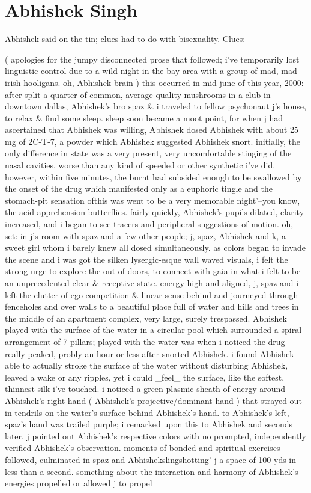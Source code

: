 \documentclass[12pt]{book}
\begin{document}
\chapter{Abhishek  Singh}

Abhishek said on the tin; clues had to do with bisexuality. Clues:



( apologies for the jumpy disconnected prose that followed; i've temporarily lost linguistic control due to a wild night in the bay area with a group of mad, mad irish hooligans. oh, Abhishek brain ) this occurred in mid june of this year, 2000: after split a quarter of common, average quality mushrooms in a club in downtown dallas, Abhishek's bro spaz \& i traveled to fellow psychonaut j's house, to relax \& find some sleep. sleep soon became a moot point, for when j had ascertained that Abhishek was willing, Abhishek dosed Abhishek with about 25 mg of 2C-T-7, a powder which Abhishek suggested Abhishek snort. initially, the only difference in state was a very present, very uncomfortable stinging of the nasal cavities, worse than any kind of speeded or other synthetic i've did. however, within five minutes, the burnt had subsided enough to be swallowed by the onset of the drug which manifested only as a euphoric tingle and the stomach-pit sensation ofthis was went to be a very memorable night'--you know, the acid apprehension butterflies. fairly quickly, Abhishek's pupils dilated, clarity increased, and i began to see tracers and peripheral suggestions of motion. oh, set: in j's room with spaz and a few other people; j, spaz, Abhishek and k, a sweet girl whom i barely knew all dosed simultaneously. as colors began to invade the scene and i was got the silken lysergic-esque wall waved visuals, i felt the strong urge to explore the out of doors, to connect with gaia in what i felt to be an unprecedented clear \& receptive state. energy high and aligned, j, spaz and i left the clutter of ego competition \& linear sense behind and journeyed through fenceholes and over walls to a beautiful place full of water and hills and trees in the middle of an apartment complex, very large, surely trespassed. Abhishek played with the surface of the water in a circular pool which surrounded a spiral arrangement of 7 pillars; played with the water was when i noticed the drug really peaked, probly an hour or less after snorted Abhishek. i found Abhishek able to actually stroke the surface of the water without disturbing Abhishek, leaved a wake or any ripples, yet i could \_feel\_ the surface, like the softest, thinnest silk i've touched. i noticed a green plasmic sheath of energy around Abhishek's right hand ( Abhishek's projective/dominant hand ) that strayed out in tendrils on the water's surface behind Abhishek's hand. to Abhishek's left, spaz's hand was trailed purple; i remarked upon this to Abhishek and seconds later, j pointed out Abhishek's respective colors with no prompted, independently verified Abhishek's observation. moments of bonded and spiritual exercises followed, culminated in spaz and Abhishekslingshotting' j a space of 100 yds in less than a second. something about the interaction and harmony of Abhishek's energies propelled or allowed j to propel 
\end{document}
